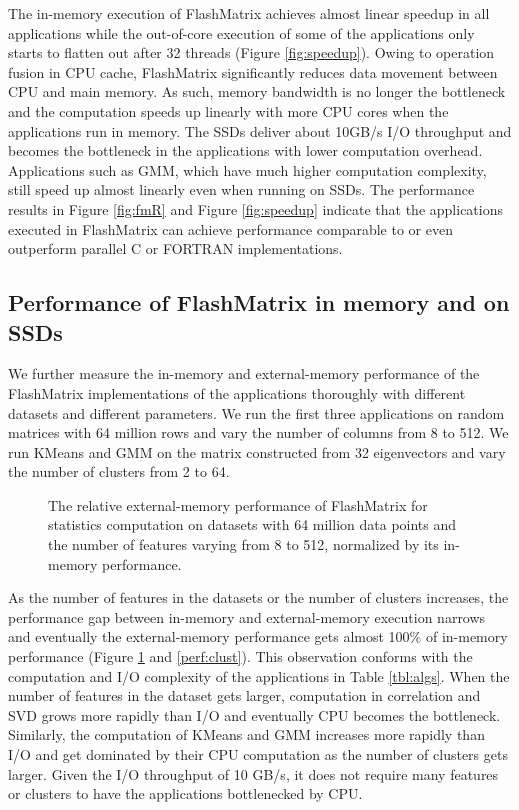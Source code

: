 The in-memory execution of FlashMatrix achieves almost linear speedup in all
applications while the out-of-core execution of some of the applications only
starts to flatten out after 32 threads (Figure \ref{fig:speedup}). Owing to
operation fusion in CPU cache, FlashMatrix significantly reduces data movement
between CPU and main memory. As such, memory bandwidth is no longer
the bottleneck and the computation speeds up linearly with more CPU cores
when the applications run in memory. The SSDs deliver about 10GB/s I/O throughput
and becomes the bottleneck in the applications with lower computation overhead.
Applications such as GMM, which have much higher computation complexity, still
speed up almost linearly even when running on SSDs. The performance results in
Figure \ref{fig:fmR} and Figure
\ref{fig:speedup} indicate that the applications executed in FlashMatrix can
achieve performance comparable to or even outperform parallel C or FORTRAN
implementations.

\subsection{Performance of FlashMatrix in memory and on SSDs}

We further measure the in-memory and external-memory performance of the FlashMatrix
implementations of the applications thoroughly with different datasets and
different parameters. We run the first three applications on random matrices
with 64 million rows and vary the number of columns from 8 to 512. We run KMeans
and GMM on the matrix constructed from 32 eigenvectors and vary the number of
clusters from 2 to 64.

\begin{figure}
	\begin{center}
		\footnotesize
		\vspace{-15pt}
		
		\vspace{-10pt}
		\caption{The relative external-memory performance of FlashMatrix for
			statistics computation on datasets with 64 million data points
			and the number of features varying from 8 to 512, normalized by
		its in-memory performance.}
		\label{perf:stat}
	\end{center}
\end{figure}

As the number of features in the datasets or the number of clusters increases,
the performance gap between in-memory and external-memory execution
narrows and eventually the external-memory performance gets almost 100\%
of in-memory performance (Figure \ref{perf:stat} and \ref{perf:clust}).
This observation conforms with the computation and I/O complexity of
the applications in Table \ref{tbl:algs}. When the number of features
in the dataset gets larger, computation in correlation and SVD grows more
rapidly than I/O and eventually CPU becomes
the bottleneck. Similarly, the computation of KMeans and GMM increases
more rapidly than I/O and get dominated by their CPU computation as the number
of clusters gets larger. Given the I/O throughput of 10 GB/s, it does not
require many features or clusters to have the applications bottlenecked by
CPU.

